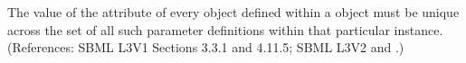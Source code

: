 The value of the attribute  of every \LocalParameter object
defined within a \KineticLaw object must be unique across the set of all
such parameter definitions within that particular \KineticLaw instance.
(References: SBML L3V1 Sections 3.3.1 and 4.11.5; SBML L3V2  and
.)
